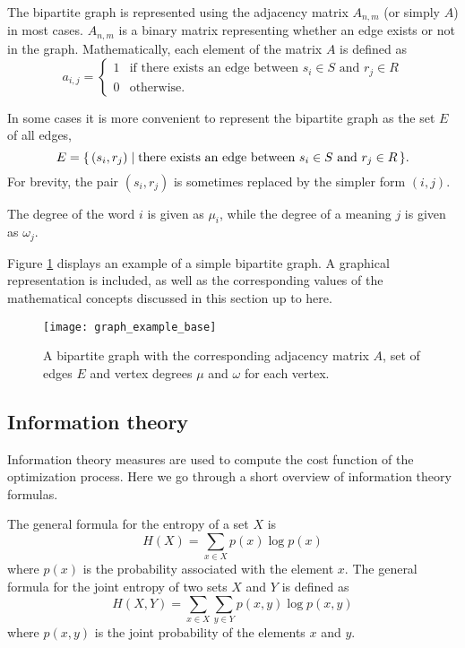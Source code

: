 The bipartite graph is represented using the adjacency matrix $A_{n,m}$ (or simply $A$) in most cases.
$A_{n,m}$ is a \nbym{} binary matrix representing whether an edge exists or not in the graph.
Mathematically, each element of the matrix $A$ is defined as
\begin{equation*}
  a_{i,j} =
  \begin{cases}
    1 & \text{if there exists an edge between $s_i \in S$ and $r_j \in R$} \\
    0 & \text{otherwise.}
  \end{cases}
\end{equation*}

In some cases it is more convenient to represent the bipartite graph as the set $E$ of all edges,
\begin{equation*}
  E = \{\,(s_i,r_j)\mid\text{there exists an edge between $s_i \in S$ and $r_j \in R$}\,\}.
\end{equation*}
For brevity, the pair $(s_i, r_j)$ is sometimes replaced by the simpler form $(i,j)$.

The degree of the word $i$ is given as $\mu_i$, while the degree of a meaning $j$ is given as $\omega_j$.

Figure \ref{fig:graph-example-base} displays an example of a simple bipartite graph.
A graphical representation is included, as well as the corresponding values of the mathematical concepts discussed in this section up to here.

\begin{figure}
  \centering
  \texttt{[image: graph\_example\_base]}
  \caption{%
    A bipartite graph with the corresponding adjacency matrix $A$, set of edges $E$ and vertex degrees $\mu$ and $\omega$ for each vertex.
  }
  \label{fig:graph-example-base}
\end{figure}

\subsection{Information theory}
\label{sec:introduction_model_info-theory}

Information theory measures are used to compute the cost function of the optimization process.
Here we go through a short overview of information theory formulas.

The general formula for the entropy of a set $X$ is
\begin{equation}
  \label{eq:definition-entropy-generic}
  H(X) = \sum_{x \in X} p(x) \log p(x)
\end{equation}
where $p(x)$ is the probability associated with the element $x$.
The general formula for the joint entropy of two sets $X$ and $Y$ is defined as
\begin{equation}
  \label{eq:definition-joint-entropy-generic}
  H(X,Y) = \sum_{x \in X} \sum_{y \in Y} p(x,y) \log p(x,y)
\end{equation}
where $p(x,y)$ is the joint probability of the elements $x$ and $y$.

